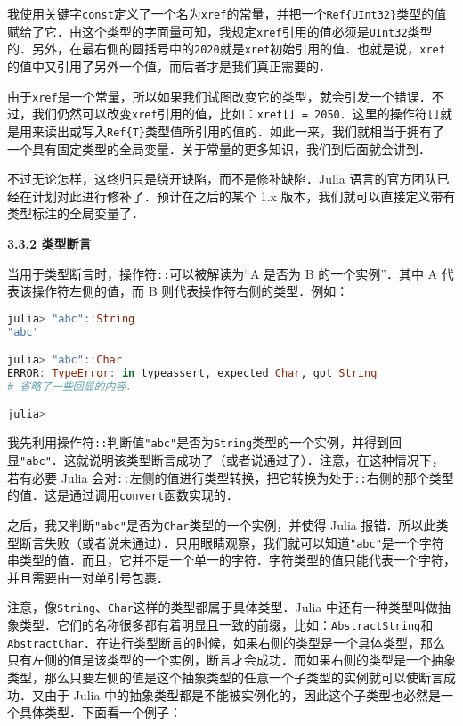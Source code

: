 我使用关键字\verb|const|定义了一个名为\verb|xref|的常量，并把一个\verb|Ref{UInt32}|类型的值赋给了它．由这个类型的字面量可知，我规定\verb|xref|引用的值必须是\verb|UInt32|类型的．另外，在最右侧的圆括号中的\verb|2020|就是\verb|xref|初始引用的值．也就是说，\verb|xref|的值中又引用了另外一个值，而后者才是我们真正需要的．

由于\verb|xref|是一个常量，所以如果我们试图改变它的类型，就会引发一个错误．不过，我们仍然可以改变\verb|xref|引用的值，比如：\verb|xref[] = 2050|．这里的操作符\verb|[]|就是用来读出或写入\verb|Ref{T}|类型值所引用的值的．如此一来，我们就相当于拥有了一个具有固定类型的全局变量．关于常量的更多知识，我们到后面就会讲到．

不过无论怎样，这终归只是绕开缺陷，而不是修补缺陷．Julia 语言的官方团队已经在计划对此进行修补了．预计在之后的某个 1.x 版本，我们就可以直接定义带有类型标注的全局变量了．

\textbf{3.3.2 类型断言}

当用于类型断言时，操作符\verb|::|可以被解读为“A 是否为 B 的一个实例”．其中 A 代表该操作符左侧的值，而 B 则代表操作符右侧的类型．例如：

\begin{lstlisting}[language=julia]
julia> "abc"::String
"abc"

julia> "abc"::Char
ERROR: TypeError: in typeassert, expected Char, got String
# 省略了一些回显的内容．

julia> 
\end{lstlisting}

我先利用操作符\verb|::|判断值\verb|"abc"|是否为\verb|String|类型的一个实例，并得到回显\verb|"abc"|．这就说明该类型断言成功了（或者说通过了）．注意，在这种情况下，若有必要 Julia 会对\verb|::|左侧的值进行类型转换，把它转换为处于\verb|::|右侧的那个类型的值．这是通过调用\verb|convert|函数实现的．

之后，我又判断\verb|"abc"|是否为\verb|Char|类型的一个实例，并使得 Julia 报错．所以此类型断言失败（或者说未通过）．只用眼睛观察，我们就可以知道\verb|"abc"|是一个字符串类型的值．而且，它并不是一个单一的字符．字符类型的值只能代表一个字符，并且需要由一对单引号包裹．

注意，像\verb|String|、\verb|Char|这样的类型都属于具体类型．Julia 中还有一种类型叫做抽象类型．它们的名称很多都有着明显且一致的前缀，比如：\verb|AbstractString|和\verb|AbstractChar|．在进行类型断言的时候，如果右侧的类型是一个具体类型，那么只有左侧的值是该类型的一个实例，断言才会成功．而如果右侧的类型是一个抽象类型，那么只要左侧的值是这个抽象类型的任意一个子类型的实例就可以使断言成功．又由于 Julia 中的抽象类型都是不能被实例化的，因此这个子类型也必然是一个具体类型．下面看一个例子：

